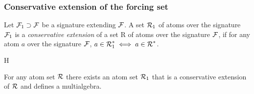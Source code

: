 \subsubsection{Conservative extension of the forcing set}

\begin{DEFINITION} \label{def:conservative-extension}
Let \({\cal F}_1\supset{\cal F}\) be a signature extending \({\cal F}\). A set \(\mbox{$\cal R$}_1\) of atoms over the signature \({\cal F}_1\) is a {\em conservative
extension} of a set \C R of atoms over the signature \({\cal F}\), if for any
atom \(a\) over the signature \({\cal F}\), \(a\in\mbox{$\cal R$}_1^\ast\iff a\in\mbox{$\cal R$}^\ast\).
\end{DEFINITION} 

\newITEM H
\begin{THEOREM} \label{th:multialgebra-exists}
For any atom set \(\mbox{$\cal R$}\) there exists an atom set \(\mbox{$\cal R$}_1\) that is a
conservative extension of \(\mbox{$\cal R$}\) and defines a multialgebra.
\end{THEOREM}
